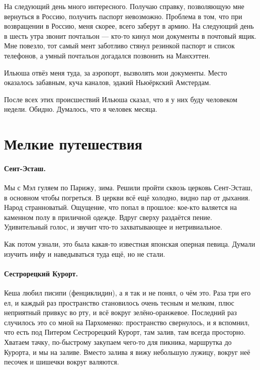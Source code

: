 \documentclass{book}
\begin{document}
На следующий день много интересного.
Получаю справку, позволяющую мне вернуться в Россию, получить паспорт невозможно.
Проблема в том, что при возвращении в Россию, меня скорее, всего заберут в армию.
На следующий день в шесть утра звонит почтальон --- кто-то кинул мои документы в почтовый ящик.
Мне повезло, тот самый мент заботливо стянул резинкой паспорт и список телефонов, а умный почтальон догадался позвонить на Манхэттен.

Ильюша отвёз меня туда, за аэропорт, вызволять мои документы.
Место оказалось забавным, куча каналов, эдакий Ньюёркский Амстердам.

После всех этих происшествий Ильюша сказал, что я у них буду человеком недели.
Обидно.
Думалось, что я человек месяца.


\section*{Мелкие путешествия}

\paragraph{Сент-Эсташ.}
Мы с Мэл гуляем по Парижу, зима.
Решили пройти сквозь церковь Сент-Эсташ, в основном чтобы погреться.
В церкви всё ещё холодно, видно пар от дыхания.
Народ странноватый. 
Ощущение, что попал в прошлое: кое-кто валяется на каменном полу в приличной одежде.
Вдруг сверху раздаётся пение.
Удивительный голос, и звучит что-то захватывающее и нетривиальное.

Как потом узнали, это была какая-то известная японская оперная певица.
Думали изучить инфу и наведываться туда ещё, но не стали.

\paragraph{Сестрорецкий Курорт.}
Кеша любил писипи (фенциклидин), а я так и не понял, о чём это.
Раза три его ел, и каждый раз пространство становилось очень тесным и мелким, плюс неприятный привкус во рту, и всё вокруг зелёно-оранжевое.
Последний раз случилось это со мной на Пархоменко: пространство свернулось, и я вспомнил, что есть под Питером Сестрорецкий Курорт, там залив, там всегда просторно.
Хватаем тачку, по-быстрому закупаем чего-то для пикника, маршрутка до Курорта, и мы на заливе.
Вместо залива я вижу небольшую лужицу, вокруг неё песочек и шишечки вокруг валяются.
\end{document}
